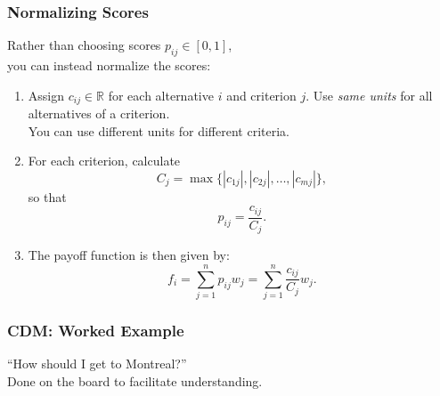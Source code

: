 \begin{frame}

\frametitle{Normalizing Scores}

\begin{changemargin}{2cm}

 Rather than choosing scores
$p_{ij} \in [0, 1]$, \\
you can instead normalize the scores:
\begin{enumerate}
\item Assign $c_{ij} \in \mathbb{R}$ for each alternative $i$ and criterion $j$.
Use \emph{same units} for all alternatives of a 
 criterion. \\ You can use different units for different criteria.
\item For each criterion, calculate
\[ C_j = \max \{ |c_{1j}|, |c_{2j}|, \ldots, |c_{mj}| \}, \]
so that
\[ p_{ij} = \frac{c_{ij}}{C_j}. \]
\item The payoff function is then given by:
\[ f_i = \sum_{j=1}^n p_{ij} w_j = \sum_{j=1}^n \frac{c_{ij}}{C_j}  w_j. \]
\end{enumerate}

\end{changemargin}

\end{frame}

\begin{frame}
\frametitle{CDM: Worked Example}

\begin{changemargin}{2cm}
``How should I get to Montreal?''\\[1em]

Done on the board to facilitate understanding.

\end{changemargin}

\end{frame}

